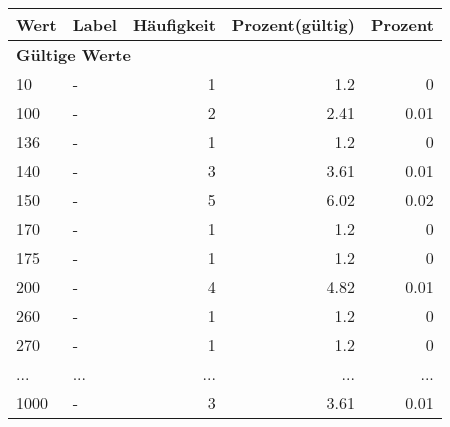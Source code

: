      \begin{longtable}{lXrrr}
     \toprule
     \textbf{Wert} & \textbf{Label} & \textbf{Häufigkeit} & \textbf{Prozent(gültig)} & \textbf{Prozent} \\
     \endhead
     \midrule
     \multicolumn{5}{l}{\textbf{Gültige Werte}}\\
        10 & \multicolumn{1}{X}{-} & %
          \num{1} &
          \num[round-mode=places,round-precision=2]{1,2} &
          \num[round-mode=places,round-precision=2]{0} \\
        100 & \multicolumn{1}{X}{-} & %
          \num{2} &
          \num[round-mode=places,round-precision=2]{2,41} &
          \num[round-mode=places,round-precision=2]{0,01} \\
        136 & \multicolumn{1}{X}{-} & %
          \num{1} &
          \num[round-mode=places,round-precision=2]{1,2} &
          \num[round-mode=places,round-precision=2]{0} \\
        140 & \multicolumn{1}{X}{-} & %
          \num{3} &
          \num[round-mode=places,round-precision=2]{3,61} &
          \num[round-mode=places,round-precision=2]{0,01} \\
        150 & \multicolumn{1}{X}{-} & %
          \num{5} &
          \num[round-mode=places,round-precision=2]{6,02} &
          \num[round-mode=places,round-precision=2]{0,02} \\
        170 & \multicolumn{1}{X}{-} & %
          \num{1} &
          \num[round-mode=places,round-precision=2]{1,2} &
          \num[round-mode=places,round-precision=2]{0} \\
        175 & \multicolumn{1}{X}{-} & %
          \num{1} &
          \num[round-mode=places,round-precision=2]{1,2} &
          \num[round-mode=places,round-precision=2]{0} \\
        200 & \multicolumn{1}{X}{-} & %
          \num{4} &
          \num[round-mode=places,round-precision=2]{4,82} &
          \num[round-mode=places,round-precision=2]{0,01} \\
        260 & \multicolumn{1}{X}{-} & %
          \num{1} &
          \num[round-mode=places,round-precision=2]{1,2} &
          \num[round-mode=places,round-precision=2]{0} \\
        270 & \multicolumn{1}{X}{-} & %
          \num{1} &
          \num[round-mode=places,round-precision=2]{1,2} &
          \num[round-mode=places,round-precision=2]{0} \\
       ... & ... & ... & ... & ... \\
        1000 & \multicolumn{1}{X}{-} & %
          \num{3} &
          \num[round-mode=places,round-precision=2]{3,61} &
          \num[round-mode=places,round-precision=2]{0,01} \\


\end{longtable}
